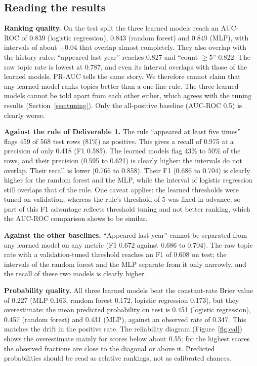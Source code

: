 \documentclass[11pt,a4paper]{article}
\newcommand{\auc}{AUC-ROC}
\begin{document}
\subsection{Reading the results}
\textbf{Ranking quality.} On the test split the three learned models reach an \auc{} of 0.839 (logistic regression), 0.843
(random forest) and 0.849 (MLP), with intervals of about $\pm 0.04$ that overlap almost completely. They also overlap with
the history rules: ``appeared last year'' reaches 0.827 and ``count $\geq 5$'' 0.822. The raw topic rate is lowest at
0.787, and even its interval overlaps with those of the learned models. PR-AUC tells the same story. We therefore cannot
claim that any learned model ranks topics better than a one-line rule. The three learned models cannot be told apart
from each other either, which agrees with the tuning results (Section~\ref{sec:tuning}). Only the all-positive
baseline (\auc{} 0.5) is clearly worse.

\textbf{Against the rule of Deliverable 1.} The rule ``appeared at least five times'' flags 459 of 568 test rows (81\%)
as positive. This gives a recall of 0.975 at a precision of only 0.418 (F1 0.585). The learned models flag 43\% to 50\%
of the rows, and their precision (0.595 to 0.621) is clearly higher: the intervals do not overlap. Their recall is
lower (0.766 to 0.858). Their F1 (0.686 to 0.704) is clearly higher for the random forest and the MLP, while the interval
of logistic regression still overlaps that of the rule. One caveat applies: the learned thresholds were tuned on
validation, whereas the rule's threshold of 5 was fixed in advance, so part of this F1 advantage reflects threshold
tuning and not better ranking, which the \auc{} comparison shows to be similar.

\textbf{Against the other baselines.} ``Appeared last year'' cannot be separated from any learned model on any metric
(F1 0.672 against 0.686 to 0.704). The raw topic rate with a validation-tuned threshold reaches an F1 of 0.608 on test; the
intervals of the random forest and the MLP separate from it only narrowly, and the recall of these two models is clearly
higher.

\textbf{Probability quality.} All three learned models beat the constant-rate Brier value of 0.227 (MLP 0.163, random
forest 0.172, logistic regression 0.173), but they overestimate: the mean predicted probability on test is 0.451 (logistic
regression), 0.457 (random forest) and 0.431 (MLP), against an observed rate of 0.347. This matches the drift in the
positive rate. The reliability diagram (Figure~\ref{fig:cal}) shows the overestimate mainly for scores below about 0.55; for
the highest scores the observed fractions are close to the diagonal or above it. Predicted probabilities should be read as
relative rankings, not as calibrated chances.
\end{document}

